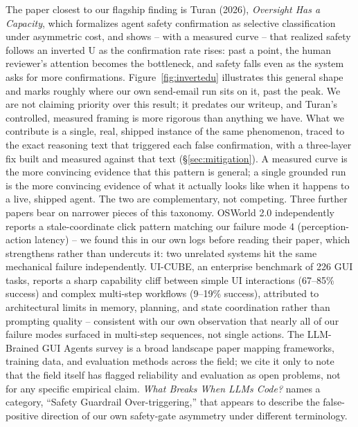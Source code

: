 \documentclass[11pt]{article}
\begin{document}
The paper closest to our flagship finding is Turan (2026), \textit{Oversight Has a Capacity}, which formalizes agent safety confirmation as selective classification under asymmetric cost, and shows -- with a measured curve -- that realized safety follows an inverted U as the confirmation rate rises: past a point, the human reviewer's attention becomes the bottleneck, and safety falls even as the system asks for more confirmations. Figure~\ref{fig:invertedu} illustrates this general shape and marks roughly where our own send-email run sits on it, past the peak. We are not claiming priority over this result; it predates our writeup, and Turan's controlled, measured framing is more rigorous than anything we have. What we contribute is a single, real, shipped instance of the same phenomenon, traced to the exact reasoning text that triggered each false confirmation, with a three-layer fix built and measured against that text (\S\ref{sec:mitigation}). A measured curve is the more convincing evidence that this pattern is general; a single grounded run is the more convincing evidence of what it actually looks like when it happens to a live, shipped agent. The two are complementary, not competing.
Three further papers bear on narrower pieces of this taxonomy. OSWorld 2.0 independently reports a stale-coordinate click pattern matching our failure mode 4 (perception-action latency) -- we found this in our own logs before reading their paper, which strengthens rather than undercuts it: two unrelated systems hit the same mechanical failure independently. UI-CUBE, an enterprise benchmark of 226 GUI tasks, reports a sharp capability cliff between simple UI interactions (67--85\% success) and complex multi-step workflows (9--19\% success), attributed to architectural limits in memory, planning, and state coordination rather than prompting quality -- consistent with our own observation that nearly all of our failure modes surfaced in multi-step sequences, not single actions. The LLM-Brained GUI Agents survey is a broad landscape paper mapping frameworks, training data, and evaluation methods across the field; we cite it only to note that the field itself has flagged reliability and evaluation as open problems, not for any specific empirical claim. \textit{What Breaks When LLMs Code?} names a category, ``Safety Guardrail Over-triggering,'' that appears to describe the false-positive direction of our own safety-gate asymmetry under different terminology.
\end{document}
